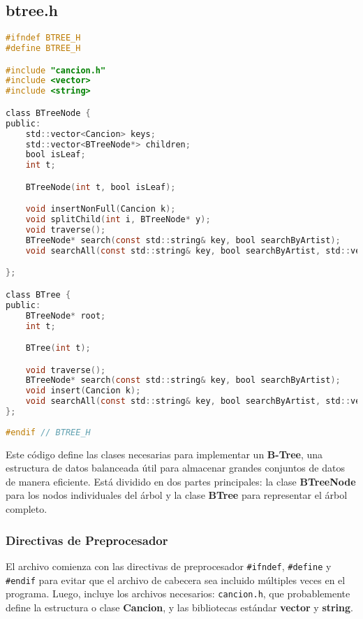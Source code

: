 \documentclass[corference]{IEEEtran}
\begin{document}
\begin{flushleft}
            \subsection{btree.h}
            
            \begin{lstlisting}[language=C, style=mystyle, caption={Cabecera de un Árbol B}]
#ifndef BTREE_H
#define BTREE_H

#include "cancion.h"
#include <vector>
#include <string>

class BTreeNode {
public:
    std::vector<Cancion> keys;
    std::vector<BTreeNode*> children;
    bool isLeaf;
    int t;

    BTreeNode(int t, bool isLeaf);

    void insertNonFull(Cancion k);
    void splitChild(int i, BTreeNode* y);
    void traverse();
    BTreeNode* search(const std::string& key, bool searchByArtist);
    void searchAll(const std::string& key, bool searchByArtist, std::vector<Cancion>& result);

};

class BTree {
public:
    BTreeNode* root;
    int t;

    BTree(int t);

    void traverse();
    BTreeNode* search(const std::string& key, bool searchByArtist);
    void insert(Cancion k);
    void searchAll(const std::string& key, bool searchByArtist, std::vector<Cancion>& result); 
};
    
#endif // BTREE_H
            \end{lstlisting}

            \noindent\hspace*{4em}Este código define las clases necesarias para implementar un \textbf{B-Tree}, una estructura de datos balanceada útil para almacenar grandes conjuntos de datos de manera eficiente. Está dividido en dos partes principales: la clase \textbf{BTreeNode} para los nodos individuales del árbol y la clase \textbf{BTree} para representar el árbol completo.
            
            \subsubsection{Directivas de Preprocesador}
                \noindent\hspace*{4em}El archivo comienza con las directivas de preprocesador \verb|#ifndef|, \verb|#define| y \verb|#endif| para evitar que el archivo de cabecera sea incluido múltiples veces en el programa. Luego, incluye los archivos necesarios: \verb|cancion.h|, que probablemente define la estructura o clase \textbf{Cancion}, y las bibliotecas estándar \textbf{vector} y \textbf{string}.
            

\end{flushleft}
\end{document}
